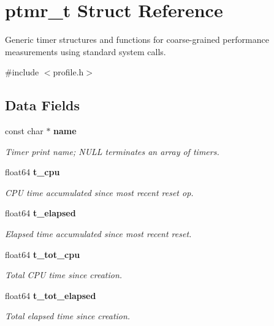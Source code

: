 \section{ptmr\+\_\+t Struct Reference}
\label{structptmr__t}


Generic timer structures and functions for coarse-\/grained performance measurements using standard system calls.  




{\ttfamily \#include $<$profile.\+h$>$}

\subsection*{Data Fields}
\begin{DoxyCompactItemize}
\item 
const char $\ast$ \textbf{ name}
\begin{DoxyCompactList}\small\item\em Timer print name; N\+U\+LL terminates an array of timers. \end{DoxyCompactList}\item 
\mbox{\label{structptmr__t_acbd784f7332329999925d396deae3a5d}} 
float64 \textbf{ t\+\_\+cpu}
\begin{DoxyCompactList}\small\item\em C\+PU time accumulated since most recent reset op. \end{DoxyCompactList}\item 
\mbox{\label{structptmr__t_a743fce329d82fd7a9130cba5bbccd991}} 
float64 \textbf{ t\+\_\+elapsed}
\begin{DoxyCompactList}\small\item\em Elapsed time accumulated since most recent reset. \end{DoxyCompactList}\item 
\mbox{\label{structptmr__t_a301d13acc21718143b8b39b7af8b6677}} 
float64 \textbf{ t\+\_\+tot\+\_\+cpu}
\begin{DoxyCompactList}\small\item\em Total C\+PU time since creation. \end{DoxyCompactList}\item 
\mbox{\label{structptmr__t_a2dc87aa035c8eb542279ca4496dd76f1}} 
float64 \textbf{ t\+\_\+tot\+\_\+elapsed}
\begin{DoxyCompactList}\small\item\em Total elapsed time since creation. \end{DoxyCompactList}\item 

\end{DoxyCompactItemize}
